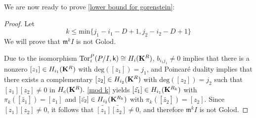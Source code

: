 \documentclass[10pt,reqno]{amsart}
\theoremstyle{definition}
\theoremstyle{remark}
\numberwithin{equation}{section}
\newcommand{\kk}{\mathsf k}
\newcommand{\m}{\mathfrak m}
\numberwithin{equation}{section}
\begin{document}
We are now ready to prove \cref{lower bound for gorenstein}:
\begin{proof}
Let
\begin{equation}\label{lower bound}
k\le \mathrm{min}\{j_1-i_1-D+1, j_2-i_2-D+1\}
    \end{equation}
We will prove that $\m^k I$ is not Golod.




Due to the isomorphism $\mathrm{Tor}_i^P(P/I, \kk)\cong H_i({\bf K}^R)$, $b_{i_1 j_1}\ne 0$ implies that there is a nonzero $[z_1]\in H_{i_1}({\bf K}^{R})$ with $\mathrm{deg}([z_1])=j_1$, and Poincar\'{e} duality implies that there exists a complementary $[z_2]\in H_{i_2}({\bf K}^R)$ with $\mathrm{deg}([z_2])=j_2$ such that $[z_1][z_2]\ne 0$ in $H_c({\bf K}^R).$
\cref{mod k}
yields
$[\tilde{z_1}]\in H_{i_1}({\bf K}^{R_k})$ with $\pi_k([\tilde{z_1}])=[z_1]$ and 
$[\tilde{z_2}]\in H_{i_2}({\bf K}^{R_k})$ with $\pi_k([\tilde{z_2}])=[z_2]$. Since $[z_1][z_2]\ne 0$, it follows that $\tilde{[z_1]}\tilde{[z_2]}\ne 0$, and therefore $\m^k I$ is not Golod.
\end{proof}


\end{document}
